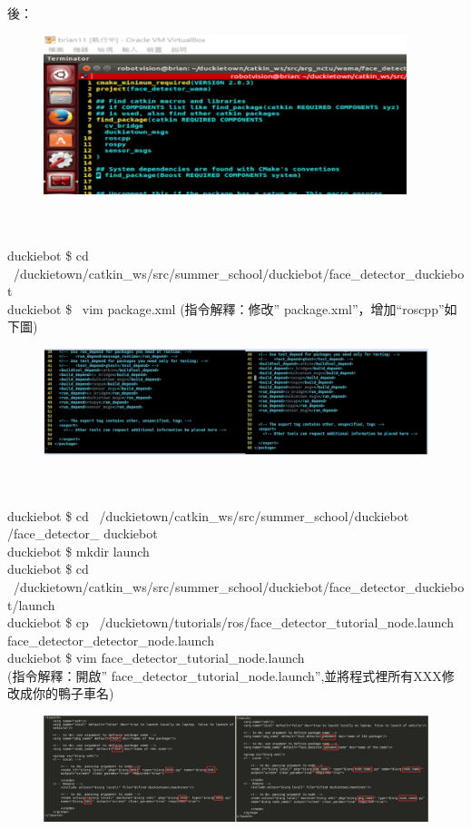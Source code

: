 \documentclass{article}
\begin{document}
\\
後：
\begin{figure}[htp]
    \begin{center}
        \includegraphics[width=300pt]{pic/5_3_4.png}
    \end{center}
\end{figure}
\\
\\duckiebot \$ cd ~/duckietown/catkin\_ws/src/summer\_school/duckiebot/face\_detector\_duckiebot
\\duckiebot \$  vim package.xml
(指令解釋：修改” package.xml”，增加“roscpp”如下圖)
\begin{figure}[htp]
    \begin{center}
        \includegraphics[width=400pt]{pic/5_3_5.png}
    \end{center}
\end{figure}
\\
\\duckiebot \$ cd ~/duckietown/catkin\_ws/src/summer\_school/duckiebot /face\_detector\_ duckiebot
\\duckiebot \$ mkdir launch
\\duckiebot \$ cd ~/duckietown/catkin\_ws/src/summer\_school/duckiebot/face\_detector\_duckiebot/launch
\\duckiebot \$ cp ~/duckietown/tutorials/ros/face\_detector\_tutorial\_node.launch face\_detector\_detector\_node.launch
\\duckiebot \$ vim face\_detector\_tutorial\_node.launch
\\(指令解釋：開啟” face\_detector\_tutorial\_node.launch”,並將程式裡所有XXX修改成你的鴨子車名)
\begin{figure}[htp]
    \begin{center}
        \includegraphics[width=400pt]{pic/5_3_10.png}
    \end{center}
\end{figure}
\end{document}
